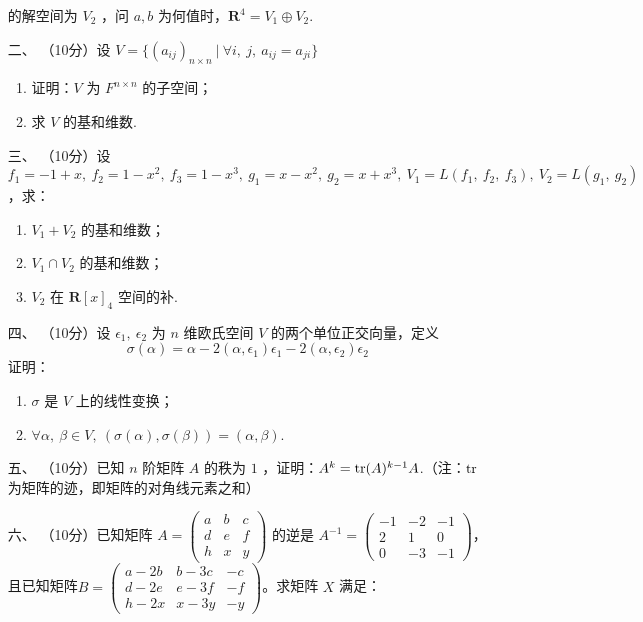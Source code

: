 \begin{enumerate}
    的解空间为 $V_2$ ，问 $a,b$ 为何值时，$\mathbf{R}^4=V_1 \oplus V_2$.
	\item[二、]（10分）设 $V=\{(a_{ij})_{n \times n}\ |\ \forall i,\ j,\ a_{ij}=a_{ji}\}$
    \begin{enumerate}[label=(\arabic*)]
        \item 证明：$V$ 为 $F^{n \times n}$ 的子空间；
        \item 求 $V$ 的基和维数.
    \end{enumerate}
	\item[三、]（10分）设 $f_1=-1+x,\ f_2=1-x^2,\ f_3=1-x^3,\ g_1=x-x^2,\ g_2=x+x^3,\ V_1=L\left(f_1,\ f_2,\ f_3\right),\ V_2=L\left(g_1,\ g_2\right)$，求：
    \begin{enumerate}[label=(\arabic*)]
        \item $V_1+V_2$ 的基和维数；
        \item $V_1 \cap V_2$ 的基和维数；
        \item $V_2$ 在 $\mathbf{R}[x]_4$ 空间的补.
    \end{enumerate}
	\item[四、]（10分）设 $\epsilon_1,\ \epsilon_2$ 为 $n$ 维欧氏空间 $V$ 的两个单位正交向量，定义
    \[\sigma(\alpha)=\alpha-2(\alpha,\epsilon_1)\epsilon_1-2(\alpha,\epsilon_2)\epsilon_2\]
    证明：
    \begin{enumerate}
        \item $\sigma$ 是 $V$ 上的线性变换；
        \item $\forall \alpha,\ \beta \in V,\ \left(\sigma (\alpha),\sigma (\beta) \right)=\left(\alpha,\beta\right)$.
    \end{enumerate}
	\item[五、]（10分）已知 $n$ 阶矩阵 $A$ 的秩为 $1$ ，证明：$A^k=\textup{tr}(A)^{k-1}A$.（注：$\textup{tr}$ 为矩阵的迹，即矩阵的对角线元素之和）
	\item[六、] （10分）已知矩阵 $A=\begin{pmatrix}a & b & c \\ d & e & f \\ h & x & y\end{pmatrix}$ 的逆是 $A^{-1}=\begin{pmatrix}-1 & -2 & -1 \\ 2 & 1 & 0 \\ 0 & -3 & -1\end{pmatrix}$，且已知矩阵$B=\begin{pmatrix}a-2b & b-3c & -c \\ d-2e & e-3f & -f \\ h-2x & x-3y & -y\end{pmatrix}$。求矩阵 $X$ 满足：

\end{enumerate}
